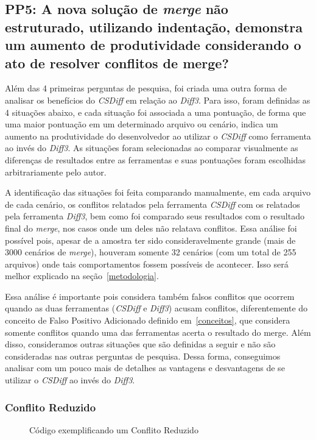 \subsection{PP5: A nova solução de \emph{merge} não estruturado, utilizando
	indentação, demonstra um aumento de produtividade considerando o ato de
	resolver conflitos de merge?}\label{concept_PP5}

Além das 4 primeiras perguntas de pesquisa, foi criada uma outra forma de
analisar os benefícios do \emph{CSDiff} em relação ao \emph{Diff3}. Para isso,
foram definidas as 4 situações abaixo, e cada situação foi associada a uma
pontuação, de forma que uma maior pontuação em um determinado arquivo ou
cenário, indica um aumento na produtividade do desenvolvedor ao utilizar o
\emph{CSDiff} como ferramenta ao invés do \emph{Diff3}. As situações foram
selecionadas ao comparar visualmente as diferenças de resultados entre as
ferramentas e suas pontuações foram escolhidas arbitrariamente pelo autor. 

A identificação das situações foi feita comparando manualmente, em cada arquivo
de cada cenário, os conflitos relatados pela ferramenta \emph{CSDiff} com os
relatados pela ferramenta \emph{Diff3}, bem como foi comparado seus resultados
com o resultado final do \emph{merge}, nos casos onde um deles não relatava
conflitos. Essa análise foi possível pois, apesar de a amostra ter sido
consideravelmente grande (mais de 3000 cenários de \emph{merge}), houveram
somente 32 cenários (com um total de 255 arquivos) onde tais comportamentos
fossem possíveis de acontecer. Isso será melhor explicado na
seção~\ref{metodologia}.

Essa análise é importante pois considera também falsos conflitos que ocorrem
quando as duas ferramentas (\emph{CSDiff} e \emph{Diff3}) acusam conflitos,
diferentemente do conceito de Falso Positivo Adicionado definido
em~\ref{conceitos}, que considera somente conflitos quando uma das ferramentas
acerta o resultado do merge. Além disso, consideramos outras situações que são
definidas a seguir e não são consideradas nas outras perguntas de pesquisa.
Dessa forma, conseguimos analisar com um pouco mais de detalhes as vantagens e
desvantagens de se utilizar o \emph{CSDiff} ao invés do \emph{Diff3}.

\subsubsection{Conflito Reduzido}
\begin{figure}[ht]
	\begin{center}
		
		\caption{Código exemplificando um Conflito Reduzido}\label{conflito_reduzido}
	\end{center}
\end{figure}

